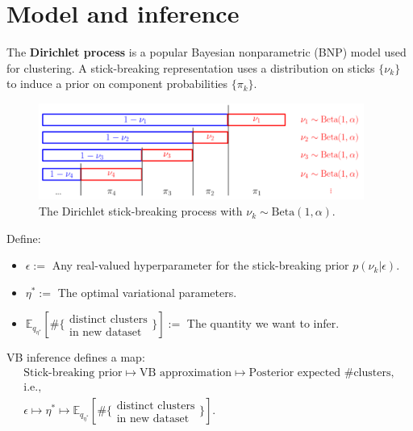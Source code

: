 \documentclass[a0,plainsections,30pt]{sciposter}\usepackage[]{graphicx}\usepackage[]{color}
\newcommand{\Expect}{\mathbb{E}}
\newcommand{\etaopt}{\eta^{*}}
\newcommand{\targetexpectation}{\Expect_{q_{\eta^*}}
\left[\#\{\substack{\text{distinct clusters}\\\text{in new dataset}}\} \right]}
\begin{document}
\begin{minipage}[t]{0.45\textwidth}
\section*{Model and inference }
\vspace{-0.3in}


The \textbf{Dirichlet process} is a popular Bayesian nonparametric
(BNP) model used for clustering.  A stick-breaking representation uses
a distribution on sticks $\{\nu_k\}$ to induce a prior on component
probabilities $\{\pi_k\}$.

\begin{figure}
\centering
\includegraphics[width = 0.95\textwidth]{./static_images/DP_stick_breaking.png}
\caption{The Dirichlet stick-breaking process with $\nu_k \sim \mathrm{Beta}(1, \alpha)$.}
\end{figure}
%
%
\vspace{-0.3in}
Define:
\begin{itemize}
\item $\epsilon :=$ Any real-valued hyperparameter for the stick-breaking prior
    $p(\nu_k | \epsilon)$.
\item $\etaopt :=$ The optimal variational parameters.
\item $\targetexpectation :=$ The quantity we want to infer.
\end{itemize}

\begin{mdframed}[style=MyFrame]
VB inference defines a map:
%
\begin{gather*}
\textrm{Stick-breaking prior}
    \mapsto \textrm{VB approximation}
    \mapsto \textrm{Posterior expected \# clusters},\\
\textrm{i.e.,}\\
\epsilon
    \mapsto \etaopt
    \mapsto \targetexpectation.
\end{gather*}
\end{mdframed}


\end{minipage}
\end{document}
